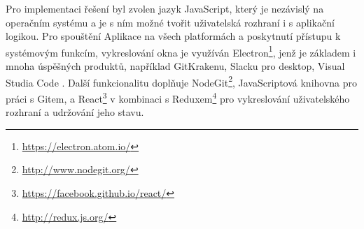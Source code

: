 Pro implementaci řešení byl zvolen jazyk JavaScript, který je nezávislý na operačním systému a je s ním možné tvořit uživatelská rozhraní i s aplikační logikou. Pro spouštění Aplikace na všech platformách a poskytnutí přístupu k systémovým funkcím, vykreslování okna je využíván Electron\footnote{\url{https://electron.atom.io/}}, jenž je základem i mnoha úspěšných produktů, například GitKrakenu, Slacku pro desktop, Visual Studia Code \cite{electron-representative}. Další funkcionalitu doplňuje NodeGit\footnote{\url{http://www.nodegit.org/}}, JavaScriptová knihovna pro práci s Gitem, a React\footnote{\url{https://facebook.github.io/react/}} v kombinaci s Reduxem\footnote{\url{http://redux.js.org/}} pro vykreslování uživatelského rozhraní a udržování jeho stavu.